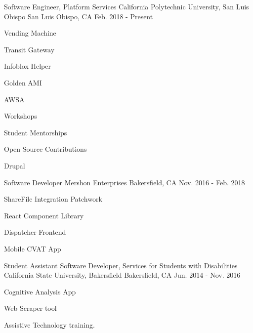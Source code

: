 

\begin{cventries}

  \cventry
    {Software Engineer, Platform Services} %
    {California Polytechnic University, San Luis Obispo} %
    {San Luis Obispo, CA} %
    {Feb. 2018 - Present} %
    {
      \begin{cvitems} %
        \item {Vending Machine}
        \item {Transit Gateway}
        \item {Infoblox Helper}
        \item {Golden AMI}
        \item {AWSA}
        \item {Workshops}
        \item {Student Mentorships}
        \item {Open Source Contributions}
        \item {Drupal}
      \end{cvitems}
    }

  \cventry
    {Software Developer} %
    {Mershon Enterprises} %
    {Bakersfield, CA} %
    {Nov. 2016 - Feb. 2018} %
    {
      \begin{cvitems} %
        \item {ShareFile Integration Patchwork}
        \item {React Component Library}
        \item {Dispatcher Frontend}
        \item {Mobile CVAT App}
      \end{cvitems}
    }

  \cventry
    {Student Assistant Software Developer, Services for Students with Disabilities} %
    {California State University, Bakersfield} %
    {Bakersfield, CA} %
    {Jun. 2014 - Nov. 2016} %
    {
      \begin{cvitems} %
        \item {Cognitive Analysis App}
        \item {Web Scraper tool}
        \item {Assistive Technology training.}
      \end{cvitems}
    }
\end{cventries}
